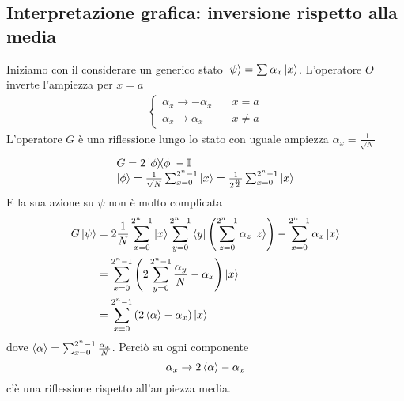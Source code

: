 \subsection*{Interpretazione grafica: inversione rispetto alla media}
Iniziamo con il considerare un generico stato $\ket \psi = \sum \alpha_x\ket x$. L'operatore $O$ inverte l'ampiezza per $x=a$
\begin{equation*}
    \begin{aligned}
        \begin{cases}
            \alpha_x \rightarrow -\alpha_x \quad &x=a\\
            \alpha_x \rightarrow \alpha_x \quad &x\neq a
        \end{cases}
    \end{aligned}
\end{equation*}
L'operatore $G$ è una riflessione lungo lo stato con uguale ampiezza $\alpha_x=\frac 1 {\sqrt N}$
\begin{equation*}
    \begin{array}{ll}
        G=2\op{\phi}{\phi}-\mathbb{I} \\
        \ket \phi = \frac {1}{\sqrt N} \sum_{x=0}^{2^n-1}\ket x = \frac{1}{2^{\frac n2}}\sum_{x=0}^{2^n-1}\ket x
    \end{array}
\end{equation*}
E la sua azione su $\psi$ non è molto complicata
\begin{equation*}
    \begin{aligned}
        G\ket \psi &= 2 \frac 1 N \sum_{x=0}^{2^n-1}\ket x \sum_{y=0}^{2^n-1}\bra y \left(\sum_{z=0}^{2^n-1}\alpha_z \ket z\right) - \sum_{x=0}^{2^n-1}\alpha_x\ket x \\
        & = \sum_{x=0}^{2^n-1}\left(2\sum_{y=0}^{2^n-1} \frac{\alpha_y}{N} - \alpha_x \right)\ket x \\
        & = \sum_{x=0}^{2^n-1}\left(2\expval{\alpha}-\alpha_x\right)\ket x
    \end{aligned}
\end{equation*}
dove $\expval{\alpha}=\sum_{x=0}^{2^n-1}\frac {\alpha_x}{N}$. Perciò su ogni componente
\begin{equation*}
    \alpha_x \rightarrow 2\expval{\alpha}-\alpha_x
\end{equation*}
c'è una riflessione rispetto all'ampiezza media.